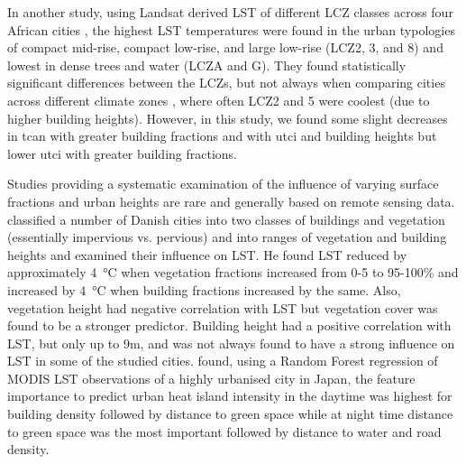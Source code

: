 \documentclass[final,3p,times,authoryear]{elsarticle}
\begin{document}
In another study, using Landsat derived LST of different LCZ classes across four African cities \citep{Li2022}, the highest LST temperatures were found in the urban typologies of compact mid-rise, compact low-rise, and large low-rise (LCZ2, 3, and 8) and lowest in dense trees and water (LCZA and G). They found statistically significant differences between the LCZs, but not always when comparing cities across different climate zones , where often LCZ2 and 5 were coolest (due to higher building heights). However, in this study, we found some slight decreases in \gls{tcan} with greater building fractions and with \gls{utci} and building heights but lower \gls{utci} with greater building fractions. 



Studies providing a systematic examination of the influence of varying surface fractions and urban heights are rare and generally based on remote sensing data. \cite{Alexander2021} classified a number of Danish cities into two classes of buildings and vegetation (essentially impervious vs. pervious) and into ranges of vegetation and building heights and examined their influence on LST. He found LST reduced by approximately 4\SI{}{\degreeCelsius} when vegetation fractions increased from 0-5 to 95-100\% and increased by 4\SI{}{\degreeCelsius} when building fractions increased by the same. Also, vegetation height had negative correlation with LST but vegetation cover was found to be a stronger predictor. Building height had a positive correlation with LST, but only up to 9m, and was not always found to have a strong influence on LST in some of the studied cities. \cite{Peng2022} found, using a Random Forest regression of MODIS LST observations of a highly urbanised city in Japan, the 
feature importance to predict urban heat island intensity in the daytime was highest for building density followed by distance to green space while at night time distance to green space was the most important followed by distance to water and road density.
\end{document}
